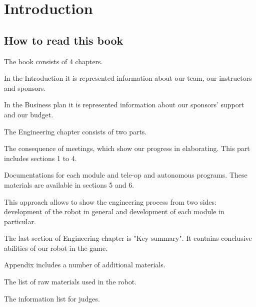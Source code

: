 \section{Introduction}

\subsection{How to read this book}

The book consists of 4 chapters. \newline
\begin{enumerate*}
    \item In the Introduction it is represented information about our team, our instructors and sponsors. 
    
    
    \item In the Business plan it is represented information about our sponsors' support and our budget.\newline
    
    \item The Engineering chapter consists of two parts. 
    \begin{itemize*}
    	\item The consequence of meetings, which show our progress in elaborating. This part includes sections 1 to 4.
    	
    	\item Documentations for each module and tele-op and autonomous programs. These materials are available in sections 5 and 6.
    	
    \end{itemize*}
    
    This approach allows to show the engineering process from two sides: development of the robot in general and development of each module in particular.
    
    The last section of Engineering chapter is "Key summary". It contains conclusive abilities of our robot in the game.
    
    \item Appendix includes a number of additional materials.
    \begin{itemize*}
    	\item The list of raw materials used in the robot.
    	
    	
    	\item The information list for judges.
    	
    \end{itemize*}
    
\end{enumerate*}

	
\fillpage	